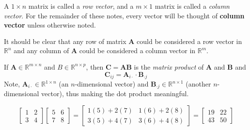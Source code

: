 \begin{definition}
A $1 \times n$ matrix is called a \textit{row vector}, and a $m \times 1$ matrix is called a \textit{column vector}. For the remainder of these notes, every vector will be thought of \textbf{column vector} unless otherwise noted.
\end{definition}

It should be clear that any row of matrix $\mathbf{A}$ could be considered a row vector in $\mathbb{R}^n$ and any column of $\mathbf{A}$ could be considered a column vector in $\mathbb{R}^m$.

\begin{definition}
If $\mathbf{A} \in \mathbb{R}^{m \times n}$ and $B \in \mathbb{R}^{n \times p}$, then $\mathbf{C} = \mathbf{A}\mathbf{B}$ is the \textit{matrix product} of $\mathbf{A}$ and $\mathbf{B}$ and
\begin{equation}
\mathbf{C}_{ij} = \mathbf{A}_{i\cdot} \cdot \mathbf{B}_{\cdot j}
\end{equation}
Note, $\mathbf{A}_{i\cdot} \in \mathbb{R}^{1 \times n}$ (an $n$-dimensional vector) and $\mathbf{B}_{\cdot j} \in \mathbb{R}^{n \times 1}$ (another $n$-dimensional vector), thus making the dot product meaningful. 
\end{definition}

\begin{example} 
\begin{equation}
\left[
\begin{array}{cc}
1 & 2\\
3 & 4
\end{array}
\right] 
\left[
\begin{array}{cc}
5 & 6\\
7 & 8
\end{array}
\right] = 
\left[
\begin{array}{cc}
1(5) + 2(7) & 1(6) + 2(8)\\
3(5) + 4(7) & 3(6) + 4(8)
\end{array}
\right] = 
\left[
\begin{array}{cc}
19 & 22\\
43 & 50
\end{array}
\right]
\end{equation}
\end{example}


